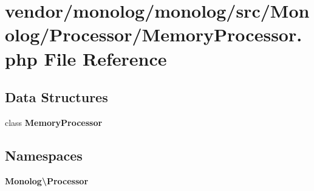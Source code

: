 \section{vendor/monolog/monolog/src/\+Monolog/\+Processor/\+Memory\+Processor.php File Reference}
\label{_memory_processor_8php}
\subsection*{Data Structures}
\begin{DoxyCompactItemize}
\item 
class {\bf Memory\+Processor}
\end{DoxyCompactItemize}
\subsection*{Namespaces}
\begin{DoxyCompactItemize}
\item 
 {\bf Monolog\textbackslash{}\+Processor}
\end{DoxyCompactItemize}
